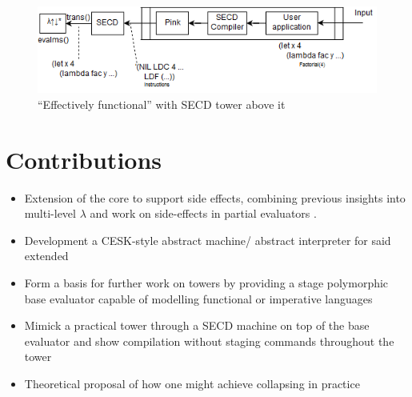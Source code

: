 \documentclass{article}
\begin{document}
\begin{figure}[t]
	\centering
	\includegraphics[scale=0.75]{secd_arch.png}
	\caption{``Effectively functional'' \mslangStar with SECD tower above it}\label{secd_tower_arch}
\end{figure}

\section{Contributions}
\begin{itemize}
	\item Extension of the core \mslang to support side effects, combining previous insights into multi-level $\lambda$ \cite{nielson1996multi} and work on side-effects in partial evaluators \cite{asai1997partial}.
	\item Development a CESK-style abstract machine/ abstract interpreter for said extended \mslang
	\item Form a basis for further work on towers by providing a stage polymorphic base evaluator capable of modelling functional or imperative languages
	\item Mimick a practical tower through a SECD machine on top of the base evaluator and show compilation without staging commands throughout the tower
	\item Theoretical proposal of how one might achieve collapsing in practice
\end{itemize}
	


\end{document}
